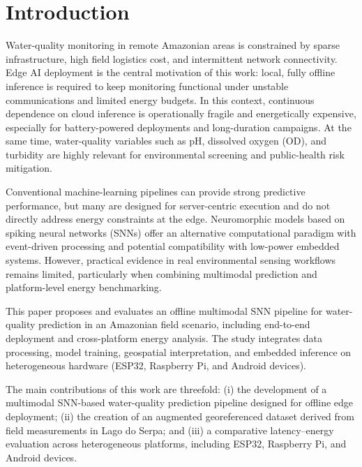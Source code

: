 \section{Introduction}

Water-quality monitoring in remote Amazonian areas is constrained by sparse infrastructure, high field logistics cost, and intermittent network connectivity. Edge AI deployment is the central motivation of this work: local, fully offline inference is required to keep monitoring functional under unstable communications and limited energy budgets. In this context, continuous dependence on cloud inference is operationally fragile and energetically expensive, especially for battery-powered deployments and long-duration campaigns. At the same time, water-quality variables such as pH, dissolved oxygen (OD), and turbidity are highly relevant for environmental screening and public-health risk mitigation.

Conventional machine-learning pipelines can provide strong predictive performance, but many are designed for server-centric execution and do not directly address energy constraints at the edge. Neuromorphic models based on spiking neural networks (SNNs) offer an alternative computational paradigm with event-driven processing and potential compatibility with low-power embedded systems. However, practical evidence in real environmental sensing workflows remains limited, particularly when combining multimodal prediction and platform-level energy benchmarking.

This paper proposes and evaluates an offline multimodal SNN pipeline for water-quality prediction in an Amazonian field scenario, including end-to-end deployment and cross-platform energy analysis. The study integrates data processing, model training, geospatial interpretation, and embedded inference on heterogeneous hardware (ESP32, Raspberry Pi, and Android devices).

The main contributions of this work are threefold: (i) the development of a multimodal SNN-based water-quality prediction pipeline designed for offline edge deployment; (ii) the creation of an augmented georeferenced dataset derived from field measurements in Lago do Serpa; and (iii) a comparative latency--energy evaluation across heterogeneous platforms, including ESP32, Raspberry Pi, and Android devices.
